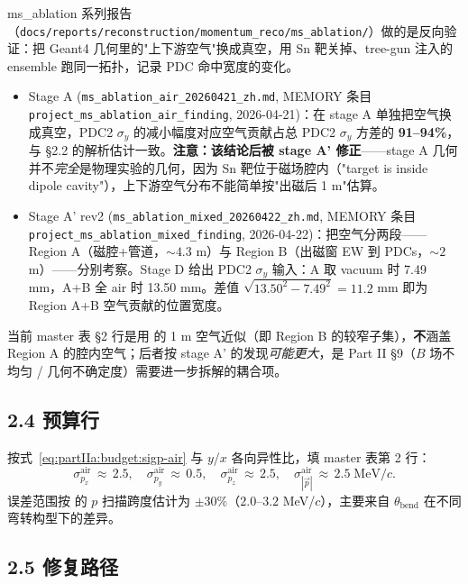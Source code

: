 ms\_ablation 系列报告（\texttt{docs/reports/reconstruction/momentum\_reco/ms\_ablation/}）做的是反向验证：把 Geant4 几何里的"上下游空气"换成真空，用 Sn 靶关掉、tree-gun 注入的 ensemble 跑同一拓扑，记录 PDC 命中宽度的变化。
\begin{itemize}
  \item Stage A (\texttt{ms\_ablation\_air\_20260421\_zh.md}, MEMORY 条目 \texttt{project\_ms\_ablation\_air\_finding}, 2026-04-21)：在 stage A 单独把空气换成真空，PDC2 $\sigma_y$ 的减小幅度对应空气贡献占总 PDC2 $\sigma_y$ 方差的 \textbf{91--94\%}，与 §2.2 的解析估计一致。\textbf{注意：该结论后被 stage A' 修正}——stage A 几何并不\emph{完全}是物理实验的几何，因为 Sn 靶位于磁场腔内（"target is inside dipole cavity"），上下游空气分布不能简单按"出磁后 1 m"估算。
  \item Stage A' rev2 (\texttt{ms\_ablation\_mixed\_20260422\_zh.md}, MEMORY 条目 \texttt{project\_ms\_ablation\_mixed\_finding}, 2026-04-22)：把空气分两段——Region A（磁腔+管道，$\sim 4.3$ m）与 Region B（出磁窗 EW 到 PDCs，$\sim 2$ m）——分别考察。Stage D 给出 PDC2 $\sigma_y$ 输入：A 取 vacuum 时 7.49 mm，A+B 全 air 时 13.50 mm。差值 $\sqrt{13.50^2-7.49^2}=11.2$ mm 即为 Region A+B 空气贡献的位置宽度。
\end{itemize}
当前 master 表 §2 行是用 \StatusReport{} 的 1 m 空气近似（即 Region B 的较窄子集），\textbf{不}涵盖 Region A 的腔内空气；后者按 stage A' 的发现\emph{可能更大}，是 Part II §9（$B$ 场不均匀 / 几何不确定度）需要进一步拆解的耦合项。

\subsection*{2.4 预算行}

按式~\eqref{eq:partIIa:budget:sigp-air} 与 $y$/$x$ 各向异性比，填 master 表第 2 行：
\begin{equation}
  \sigma_{p_x}^\mathrm{air}\,\approx\,2.5,\quad
  \sigma_{p_y}^\mathrm{air}\,\approx\,0.5,\quad
  \sigma_{p_z}^\mathrm{air}\,\approx\,2.5,\quad
  \sigma_{|\vec p|}^\mathrm{air}\,\approx\,2.5\;\mathrm{MeV}/c.
  \label{eq:partIIa:budget:row2}
\end{equation}
误差范围按 \StatusReport{} 的 $p$ 扫描跨度估计为 $\pm 30\%$（$2.0$--$3.2$ MeV/$c$），主要来自 $\theta_\mathrm{bend}$ 在不同弯转构型下的差异。

\subsection*{2.5 修复路径}


